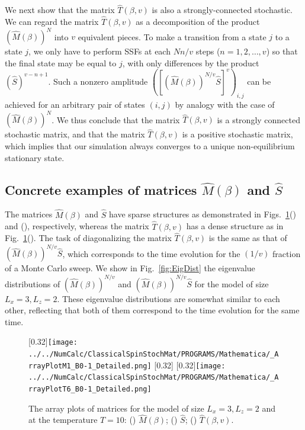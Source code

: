 We next show that the matrix $\hat{T}(\beta,v)$ is also a strongly-connected stochastic.  We can regard the matrix $\hat{T}(\beta,v)$ as a decomposition of the product $\left(\hat{M}(\beta)\right)^{N}$ into $v$ equivalent pieces. To make a transition from a state $j$ to a state $j$, we only have to perform SSFs at each $Nn/v$ steps ($n=1,2,\dots,v$) so that the final state may be equal to $j$, with only differences by the product $\left(\hat{S}\right)^{v-n+1}$. Such a nonzero amplitude $\left(\left[\left(\hat{M}(\beta)\right)^{N/v}\hat{S}\right]^{v}\right)_{i,j}$ can be achieved for an arbitrary pair of states $(i,j)$ by analogy with the case of $\left(\hat{M}(\beta)\right)^{N}$. We thus conclude that the matrix $\hat{T}(\beta,v)$ is a strongly connected stochastic matrix, and that the matrix $\hat{T}(\beta,v)$ is a positive stochastic matrix, which implies that our simulation always converges to a unique non-equilibrium stationary state.
\subsection{Concrete examples of matrices $\hat{M}(\beta)$ and $\hat{S}$}

The matrices $\hat{M}(\beta)$ and $\hat{S}$ have sparse structures as demonstrated in Figs.~\ref{fig:ArrayPlot}() and (), respectively, whereas the matrix $\hat{T}(\beta,v)$ has a dense structure as in Fig.~\ref{fig:ArrayPlot}(). The task of diagonalizing the matrix $\hat{T}(\beta,v)$ is the same as that of $\left(\hat{M}(\beta)\right)^{N/v}\hat{S}$, which corresponds to the time evolution for the $(1/v)$ fraction of a Monte Carlo sweep. We show in Fig.~\ref{fig:EigDist} the eigenvalue distributions of $\left(\hat{M}(\beta)\right)^{N/v}$ and $\left(\hat{M}(\beta)\right)^{N/v}\hat{S}$ for the model of size $L_{x}=3,L_{z}=2$. These eigenvalue distributions are somewhat similar to each other, reflecting that both of them correspond to 
the time evolution for the same time.

\begin{figure}[htbp]
	\centering
	\subcaptionbox{\label{fig:ArrayPlotM}}[0.32\linewidth]{\texttt{[image: ../../NumCalc/ClassicalSpinStochMat/PROGRAMS/Mathematica/\_ArrayPlotM1\_B0-1\_Detailed.png]}}
	\subcaptionbox{\label{fig:ArrayPlotS}}[0.32\linewidth]{}
	\subcaptionbox{\label{fig:ArrayPlotT}}[0.32\linewidth]{\texttt{[image: ../../NumCalc/ClassicalSpinStochMat/PROGRAMS/Mathematica/\_ArrayPlotT6\_B0-1\_Detailed.png]}}
	
	\caption{The array plots of matrices for the model of size $L_{x}=3, L_{z}=2$ and at the temperature $T=10$: () $\hat{M}(\beta)$; () $\hat{S}$; () $\hat{T}(\beta,v)$.}
	\label{fig:ArrayPlot}
\end{figure}

